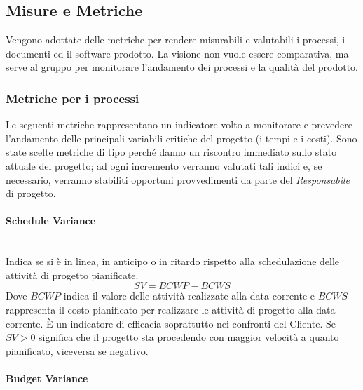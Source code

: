 		
	
	\subsection{Misure e Metriche}
	\label{MisureMetriche}
	
	Vengono adottate delle metriche per rendere misurabili e valutabili i processi, i documenti ed il software prodotto. La visione non vuole essere comparativa, ma serve al gruppo per monitorare l'andamento dei processi e la qualità del prodotto.
		
		\subsubsection{Metriche per i processi}
		\label{MetricheProcessi}
		Le seguenti metriche rappresentano un indicatore volto a monitorare e prevedere l'andamento delle principali variabili critiche del progetto (i tempi e i costi). Sono state scelte metriche di tipo  perché danno un riscontro immediato sullo stato attuale del progetto; ad ogni incremento verranno valutati tali indici e, se necessario, verranno stabiliti opportuni provvedimenti da parte del \emph{Responsabile} di progetto.
		
			\paragraph{Schedule Variance} \mbox{} \\
			\label{ScheduleVariance}\newline
			Indica se si è in linea, in anticipo o in ritardo rispetto alla schedulazione delle attività di progetto pianificate.
			\[
			SV = BCWP - BCWS
			\]
			Dove $BCWP$ indica il valore delle attività realizzate alla data corrente e $BCWS$ rappresenta il costo pianificato per realizzare le attività di progetto alla data corrente. 
			È un indicatore di efficacia soprattutto nei confronti del Cliente. Se $SV>0$ significa che il progetto sta procedendo con maggior velocità a quanto pianificato, viceversa se negativo.
			
			\paragraph{Budget Variance}\mbox{} \\
			
